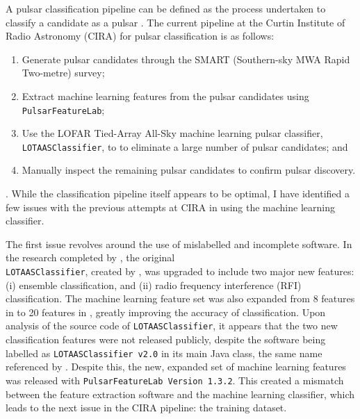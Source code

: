 \documentclass{article}
\begin{document}
A pulsar classification pipeline can be defined as the process undertaken to classify a candidate as a pulsar \autocite{swainston}. The current pipeline at the Curtin Institute of Radio Astronomy (CIRA) for pulsar classification is as follows:
\begin{enumerate}[label=\roman*.]
    \item Generate pulsar candidates through the SMART (Southern-sky MWA Rapid Two-metre) survey;
    \item Extract machine learning features from the pulsar candidates using \\\verb|PulsarFeatureLab|;
    \item Use the LOFAR Tied-Array All-Sky machine learning pulsar classifier, \verb|LOTAASClassifier|, to to eliminate a large number of pulsar candidates; and
    \item Manually inspect the remaining pulsar candidates to confirm pulsar discovery.
\end{enumerate}
\autocite{swainston}. While the classification pipeline itself appears to be optimal, I have identified a few issues with the previous attempts at CIRA in using the machine learning classifier.

The first issue revolves around the use of mislabelled and incomplete software. In the research completed by \textcite{tan}, the original \\\verb|LOTAASClassifier|, created by \textcite{lyon}, was upgraded to include two major new features: (i) ensemble classification, and (ii) radio frequency interference (RFI) classification. The machine learning feature set was also expanded from 8 features in \textcite{lyon} to 20 features in \textcite{tan}, greatly improving the accuracy of classification. Upon analysis of the source code of \verb|LOTAASClassifier|, it appears that the two new classification features were not released publicly, despite the software being labelled as \verb|LOTAASClassifier v2.0| in its main Java class, the same name referenced by \textcite{tan}. Despite this, the new, expanded set of machine learning features was released with \verb|PulsarFeatureLab Version 1.3.2|. This created a mismatch between the feature extraction software and the machine learning classifier, which leads to the next issue in the CIRA pipeline: the training dataset.
\end{document}
